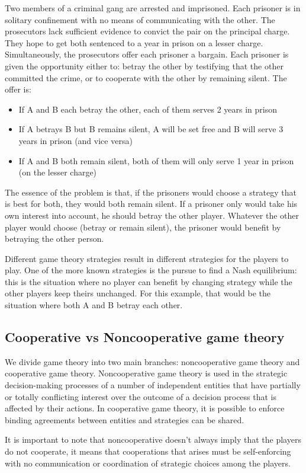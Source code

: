 \begin{displayquote}
Two members of a criminal gang are arrested and imprisoned. Each prisoner is in solitary confinement with no means of communicating with the other. The prosecutors lack sufficient evidence to convict the pair on the principal charge. They hope to get both sentenced to a year in prison on a lesser charge. Simultaneously, the prosecutors offer each prisoner a bargain. Each prisoner is given the opportunity either to: betray the other by testifying that the other committed the crime, or to cooperate with the other by remaining silent. The offer is:
	\begin{itemize}
		\item If A and B each betray the other, each of them serves 2 years in prison
		\item If A betrays B but B remains silent, A will be set free and B will serve 3 years in prison (and vice versa)
		\item If A and B both remain silent, both of them will only serve 1 year in prison (on the lesser charge)
	\end{itemize}	
\end{displayquote}

The essence of the problem is that, if the prisoners would choose a strategy that is best for both, they would both remain silent. If a prisoner only would take his own interest into account, he should betray the other player. Whatever the other player would choose (betray or remain silent), the prisoner would benefit by betraying the other person.

Different game theory strategies result in different strategies for the players to play. One of the more known strategies is the pursue to find a Nash equilibrium: 
this is the situation where no player can benefit by changing strategy while the other players keep theirs unchanged. For this example, that would be the situation where both A and B betray each other.    

\subsection{Cooperative vs Noncooperative game theory}
We divide game theory into two main branches: noncooperative game theory and cooperative game theory. Noncooperative game theory is used in the strategic decision-making processes of a number of independent entities that have partially or totally conflicting interest over the outcome of a decision process that is affected by their actions.  In cooperative game theory, it is possible to enforce binding agreements between entities and strategies can be shared. 

It is important to note that noncooperative doesn't always imply that the players do not cooperate, it means that cooperations that arises must be self-enforcing with no communication or coordination of strategic choices among the players.   
